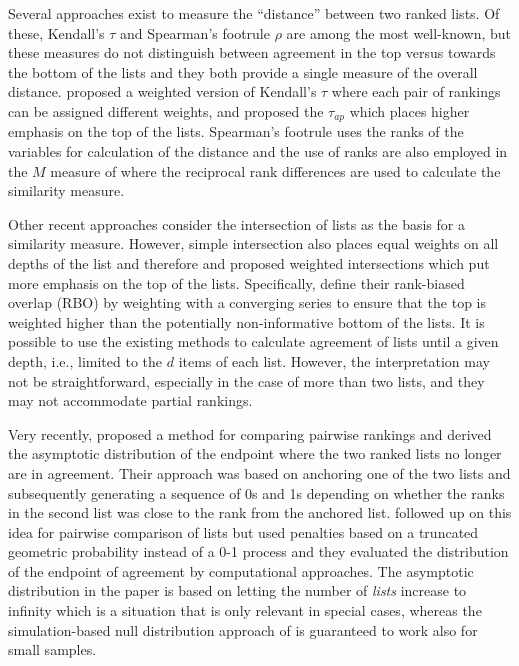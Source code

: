 \documentclass[12pt,a4paper]{article}
\theoremstyle{plain}
\begin{document}
Several approaches exist to measure the ``distance'' between two
ranked lists. Of these, Kendall's $\tau$ \citep{kendall1948} and
Spearman’s footrule $\rho$ \citep{Spearman1910} are among the most
well-known, but these measures do not distinguish between agreement in
the top versus towards the bottom of the lists and they both provide a
single measure of the overall distance. \citet{Shieh1998} proposed a
weighted version of Kendall's $\tau$ where each pair of rankings can
be assigned different weights, and \citet{Yilmaz2008} proposed the
$\tau_{ap}$ which places higher emphasis on the top of the lists.
Spearman’s footrule uses the ranks of the variables for calculation of
the distance and the use of ranks are also employed in the $M$ measure
of \citet{Bar-Ilan2006} where the reciprocal rank differences are used
to calculate the similarity measure.


Other recent approaches consider the intersection of lists as the basis
for a similarity measure. However, simple intersection also places
equal weights on all depths of the list and therefore \citet{Fagin2003} and
\citet{Webber2010} proposed weighted intersections which put more
emphasis on the top of the lists. 
Specifically, \citet{Webber2010} define their rank-biased overlap
(RBO) by weighting with a converging series to ensure that the top is
weighted higher than the potentially non-informative bottom of the
lists.  It is possible to use the existing methods to calculate
agreement of lists until a given depth, i.e., limited to the $d$ items
of each list. However, the interpretation may not be straightforward,
especially in the case of more than two lists, and they may not
accommodate partial rankings.


Very recently, \citet{hall:schi:2012} proposed a method for comparing
pairwise rankings and derived the asymptotic distribution of the
endpoint where the two ranked lists no longer are in agreement. Their
approach was based on anchoring one of the two lists and subsequently
generating a sequence of 0s and 1s depending on whether the ranks in
the second list was close to the rank from the anchored
list. \citet{samp:verd:2013} followed up on this idea for pairwise
comparison of lists but used penalties based on a truncated geometric
probability instead of a 0-1 process and they evaluated the
distribution of the endpoint of agreement by computational approaches.
The asymptotic distribution in the \citet{hall:schi:2012} paper is
based on letting the number of \emph{lists} increase to infinity which
is a situation that is only relevant in special cases, whereas the
simulation-based null distribution approach of \citet{samp:verd:2013}
is guaranteed to work also for small samples.
\end{document}
